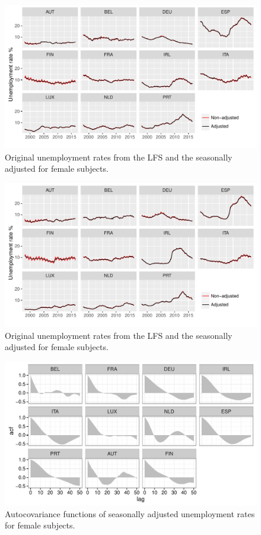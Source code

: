 \documentclass[12pt,a4paper,english]{article}
\begin{document}
\begin{appendices}
\begin{figure}[H]
\centering
\includegraphics[width=0.8\linewidth]{Graphs/ST_STSA_FE_facet}
\caption{Original unemployment rates from the LFS and the seasonally adjusted for female subjects.\cite{oecdLFS}}
\label{ST_STSA_FE_facet}
\end{figure}

\begin{figure}[H]
\centering
\includegraphics[width=0.8\linewidth]{Graphs/ST_STSA_MA_facet}
\caption{Original unemployment rates from the LFS and the seasonally adjusted for female subjects.\cite{oecdLFS}}
\label{ST_STSA_MA_facet}
\end{figure}

\begin{figure}[H]
\centering
\includegraphics[width=0.8\linewidth]{Graphs/STSA_FE_ACF_facet}
\caption{Autocovariance functions of seasonally adjusted unemployment rates for female subjects.\cite{oecdLFS}}
\label{STSA_FE_ACF_facet}
\end{figure}


\end{appendices}
\end{document}

